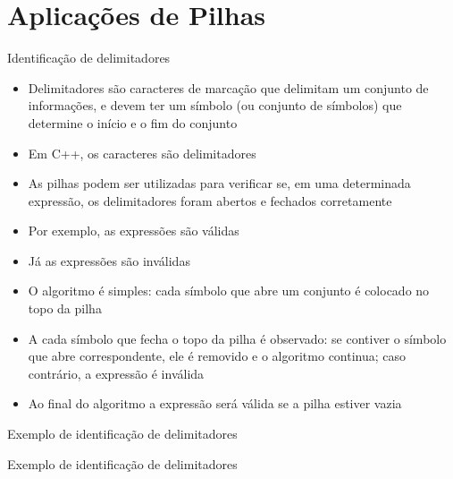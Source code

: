 \section{Aplicações de Pilhas}

\begin{frame}[fragile]{Identificação de delimitadores}

    \begin{itemize}
        \item Delimitadores são caracteres de marcação que delimitam um conjunto de informações,
            e devem ter um símbolo (ou conjunto de símbolos) que determine o início e o fim do
            conjunto

        \item Em C++, os caracteres  são delimitadores

        \item As pilhas podem ser utilizadas para verificar se, em uma determinada expressão,
            os delimitadores foram abertos e fechados corretamente

        \item Por exemplo, as expressões  são válidas

        \item Já as expressões \code{c}{[), )(, ()], [[][]} são inválidas

        \item O algoritmo é simples: cada símbolo que abre um conjunto é colocado no topo da
            pilha

        \item A cada símbolo que fecha o topo da pilha é observado: se contiver o símbolo que
            abre correspondente, ele é removido e o algoritmo continua; caso contrário, a 
            expressão é inválida

        \item Ao final do algoritmo a expressão será válida se a pilha estiver vazia

    \end{itemize}

\end{frame}

\begin{frame}[fragile]{Exemplo de identificação de delimitadores}
\end{frame}

\begin{frame}[fragile]{Exemplo de identificação de delimitadores}
\end{frame}

